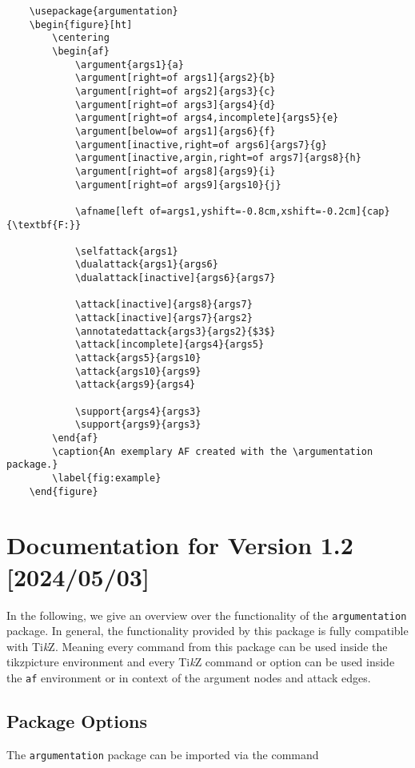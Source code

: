 \documentclass{article}
\newcommand{\tikzname}{Ti\emph{k}Z\xspace}
\newcommand{\argumentation}{\texttt{argumentation}\xspace}
\begin{document}
\begin{verbatim}
    \usepackage{argumentation}
    \begin{figure}[ht]
        \centering
        \begin{af}
            \argument{args1}{a}
            \argument[right=of args1]{args2}{b}
            \argument[right=of args2]{args3}{c}
            \argument[right=of args3]{args4}{d}
            \argument[right=of args4,incomplete]{args5}{e}
            \argument[below=of args1]{args6}{f}
            \argument[inactive,right=of args6]{args7}{g}
            \argument[inactive,argin,right=of args7]{args8}{h}
            \argument[right=of args8]{args9}{i}
            \argument[right=of args9]{args10}{j}
    
            \afname[left of=args1,yshift=-0.8cm,xshift=-0.2cm]{cap}{\textbf{F:}}
    
            \selfattack{args1}
            \dualattack{args1}{args6}
            \dualattack[inactive]{args6}{args7}
            
            \attack[inactive]{args8}{args7}
            \attack[inactive]{args7}{args2}
            \annotatedattack{args3}{args2}{$3$}
            \attack[incomplete]{args4}{args5}
            \attack{args5}{args10}
            \attack{args10}{args9}
            \attack{args9}{args4}

            \support{args4}{args3}
            \support{args9}{args3}
        \end{af}
        \caption{An exemplary AF created with the \argumentation package.}
        \label{fig:example}
    \end{figure}
\end{verbatim}

\section{Documentation for Version 1.2 [2024/05/03]}
In the following, we give an overview over the functionality of the \argumentation package.
In general, the functionality provided by this package is fully compatible with \tikzname.
Meaning every command from this package can be used inside the \textsf{tikzpicture} environment and every \tikzname command or option can be used inside the \texttt{af} environment or in context of the argument nodes and attack edges.

\subsection{Package Options}
    The \argumentation package can be imported via the command
    
\end{document}
